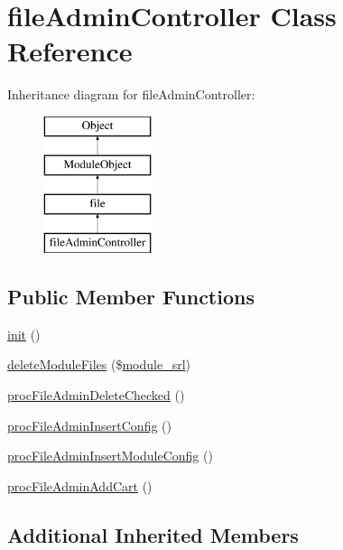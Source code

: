 \hypertarget{classfileAdminController}{}\section{file\+Admin\+Controller Class Reference}
\label{classfileAdminController}
Inheritance diagram for file\+Admin\+Controller\+:\begin{figure}[H]
\begin{center}
\leavevmode
\includegraphics[height=4.000000cm]{classfileAdminController}
\end{center}
\end{figure}
\subsection*{Public Member Functions}
\begin{DoxyCompactItemize}
\item 
\hyperlink{classfileAdminController_a7926db5aa01c3f22d73c746dfc10c318}{init} ()
\item 
\hyperlink{classfileAdminController_aaa637d3e043a4be10292fa2514c4f0f3}{delete\+Module\+Files} (\$\hyperlink{ko_8install_8php_a370bb6450fab1da3e0ed9f484a38b761}{module\+\_\+srl})
\item 
\hyperlink{classfileAdminController_a0f3042e741a71e3223ea0c9af2d224a4}{proc\+File\+Admin\+Delete\+Checked} ()
\item 
\hyperlink{classfileAdminController_a03889846de03ed7142320ef12aed5eda}{proc\+File\+Admin\+Insert\+Config} ()
\item 
\hyperlink{classfileAdminController_af0fc824e9379d6c2fdd55c7b7444c317}{proc\+File\+Admin\+Insert\+Module\+Config} ()
\item 
\hyperlink{classfileAdminController_a9ba55f911e0f616159687149b0b37fc3}{proc\+File\+Admin\+Add\+Cart} ()
\end{DoxyCompactItemize}
\subsection*{Additional Inherited Members}


